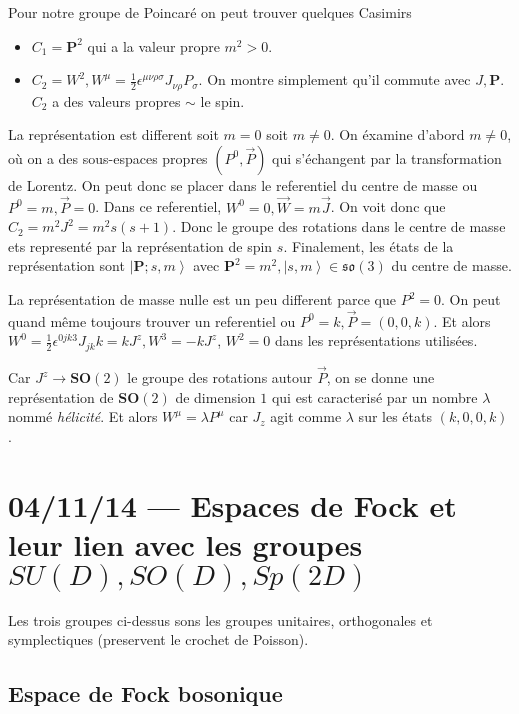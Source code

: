 \documentclass[10pt]{report}
\newcommand{\ket}[1]{\left|#1\right>}
\begin{document}
Pour notre groupe de Poincar\'e on peut trouver quelques Casimirs
\begin{itemize}
    \item $C_1 = \mathbf{P}^2$ qui a la valeur propre $m^2 > 0$.
    \item $C_2 = W^2, W^\mu = \frac{1}{2}\epsilon^{\mu \nu \rho \sigma}J_{\nu \rho}P_\sigma$. On montre simplement qu'il commute avec $J, \mathbf{P}$. $C_2$ a des valeurs propres $\sim$ le spin. 
\end{itemize}

La repr\'esentation est different soit $m=0$ soit $m \neq 0$. On \'examine d'abord $m \neq 0$, o\`u on a des sous-espaces propres $(P^0, \vec{P})$ qui s'\'echangent par la transformation de Lorentz. On peut donc se placer dans le referentiel du centre de masse ou $P^0 = m, \vec{P} = 0$. Dans ce referentiel, $W^0 = 0, \vec{W} = m\vec{J}$. On voit donc que $C_2 = m^2J^2 = m^2s(s+1)$. Donc le groupe des rotations dans le centre de masse ets represent\'e par la repr\'esentation de spin $s$. Finalement, les \'etats de la repr\'esentation sont $\ket{\mathbf{P}; s, m}$ avec $\mathbf{P}^2 = m^2, \ket{s,m} \in \mathfrak{so}(3)$ du centre de masse. 

La repr\'esentation de masse nulle est un peu different parce que $P^2 = 0$. On peut quand m\^eme toujours trouver un referentiel ou $P^0 = k, \vec{P} = (0,0,k)$. Et alors $W^0 = \frac{1}{2}\epsilon^{0jk3}J_{jk}k = kJ^z, W^3 = -kJ^z$, $W^2 = 0$ dans les repr\'esentations utilis\'ees. 

Car $J^z \to \mathbf{SO}(2)$ le groupe des rotations autour $\vec{P}$, on se donne une repr\'esentation de $\mathbf{SO}(2)$ de dimension $1$ qui est caracteris\'e par un nombre $\lambda$ nomm\'e \emph{h\'elicit\'e}. Et alors $W^\mu = \lambda P^\mu$ car $J_z$ agit comme $\lambda$ sur les \'etats $(k,0,0,k)$. 

\chapter{04/11/14 --- Espaces de Fock et leur lien avec les groupes $SU(D), SO(D), Sp(2D)$}

Les trois groupes ci-dessus sons les groupes unitaires, orthogonales et symplectiques (preservent le crochet de Poisson). 

\section{Espace de Fock bosonique}
\end{document}
